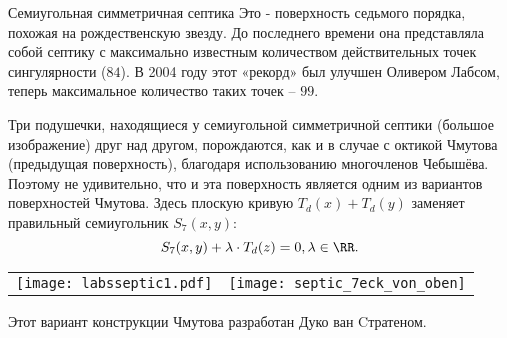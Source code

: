 \begin{surferPage}[7-угольник]{Семиугольная симметричная септика}
Это - поверхность седьмого порядка, похожая на рождественскую звезду. До последнего времени она представляла собой септику с максимально известным количеством действительных точек сингулярности ($84$). В 2004 году этот «рекорд» был улучшен Оливером Лабсом, теперь максимальное количество таких точек – $99$.  
  
Три подушечки, находящиеся у семиугольной симметричной септики (большое изображение) друг над другом, порождаются, как и в случае с октикой Чмутова (предыдущая поверхность), благодаря использованию многочленов Чебышёва. Поэтому не удивительно, что и эта поверхность является одним из вариантов поверхностей Чмутова. Здесь плоскую кривую $T_d(x)+T_d(y)$ заменяет правильный семиугольник
    $S_7(x,y)$: 
   \[S_7(x,y) + \lambda \cdot T_d(z) = 0,\lambda\in\RR.\]
    \vspace*{-1.75em}
    \begin{center}
      \begin{tabular}{c@{\qquad}c}
        \texttt{[image: labsseptic1.pdf]}
        &
        \texttt{[image: septic\_7eck\_von\_oben]}
      \end{tabular}
    \end{center}
    \vspace*{-0.3em}   
	Этот вариант конструкции Чмутова разработан Дуко ван Cтратеном.
\end{surferPage}
